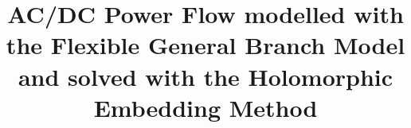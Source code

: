 \documentclass[conference]{IEEEtran}
\begin{document}
%
\title{AC/DC Power Flow modelled with the Flexible General Branch Model and solved with the Holomorphic Embedding Method}


\author{
}



% 








\maketitle
\end{document}
